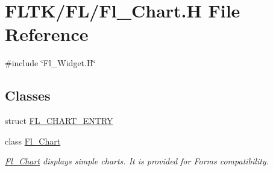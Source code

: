 \hypertarget{_fl___chart_8_h}{}\section{F\+L\+T\+K/\+F\+L/\+Fl\+\_\+\+Chart.H File Reference}
\label{_fl___chart_8_h}
{\ttfamily \#include \char`\"{}Fl\+\_\+\+Widget.\+H\char`\"{}}\newline
\subsection*{Classes}
\begin{DoxyCompactItemize}
\item 
struct \hyperlink{struct_f_l___c_h_a_r_t___e_n_t_r_y}{F\+L\+\_\+\+C\+H\+A\+R\+T\+\_\+\+E\+N\+T\+RY}
\item 
class \hyperlink{class_fl___chart}{Fl\+\_\+\+Chart}
\begin{DoxyCompactList}\small\item\em \hyperlink{class_fl___chart}{Fl\+\_\+\+Chart} displays simple charts. It is provided for Forms compatibility. \end{DoxyCompactList}\end{DoxyCompactItemize}
